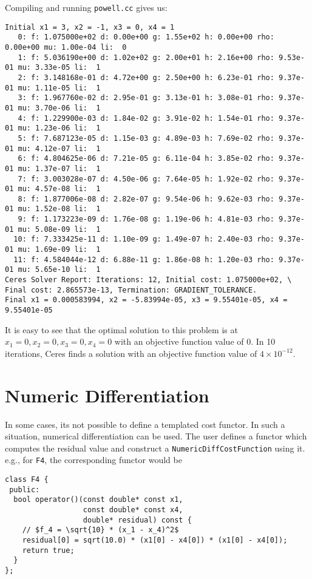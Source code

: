 Compiling and running \texttt{powell.cc} gives us:
\begin{verbatim}
Initial x1 = 3, x2 = -1, x3 = 0, x4 = 1
   0: f: 1.075000e+02 d: 0.00e+00 g: 1.55e+02 h: 0.00e+00 rho: 0.00e+00 mu: 1.00e-04 li:  0
   1: f: 5.036190e+00 d: 1.02e+02 g: 2.00e+01 h: 2.16e+00 rho: 9.53e-01 mu: 3.33e-05 li:  1
   2: f: 3.148168e-01 d: 4.72e+00 g: 2.50e+00 h: 6.23e-01 rho: 9.37e-01 mu: 1.11e-05 li:  1
   3: f: 1.967760e-02 d: 2.95e-01 g: 3.13e-01 h: 3.08e-01 rho: 9.37e-01 mu: 3.70e-06 li:  1
   4: f: 1.229900e-03 d: 1.84e-02 g: 3.91e-02 h: 1.54e-01 rho: 9.37e-01 mu: 1.23e-06 li:  1
   5: f: 7.687123e-05 d: 1.15e-03 g: 4.89e-03 h: 7.69e-02 rho: 9.37e-01 mu: 4.12e-07 li:  1
   6: f: 4.804625e-06 d: 7.21e-05 g: 6.11e-04 h: 3.85e-02 rho: 9.37e-01 mu: 1.37e-07 li:  1
   7: f: 3.003028e-07 d: 4.50e-06 g: 7.64e-05 h: 1.92e-02 rho: 9.37e-01 mu: 4.57e-08 li:  1
   8: f: 1.877006e-08 d: 2.82e-07 g: 9.54e-06 h: 9.62e-03 rho: 9.37e-01 mu: 1.52e-08 li:  1
   9: f: 1.173223e-09 d: 1.76e-08 g: 1.19e-06 h: 4.81e-03 rho: 9.37e-01 mu: 5.08e-09 li:  1
  10: f: 7.333425e-11 d: 1.10e-09 g: 1.49e-07 h: 2.40e-03 rho: 9.37e-01 mu: 1.69e-09 li:  1
  11: f: 4.584044e-12 d: 6.88e-11 g: 1.86e-08 h: 1.20e-03 rho: 9.37e-01 mu: 5.65e-10 li:  1
Ceres Solver Report: Iterations: 12, Initial cost: 1.075000e+02, \
Final cost: 2.865573e-13, Termination: GRADIENT_TOLERANCE.
Final x1 = 0.000583994, x2 = -5.83994e-05, x3 = 9.55401e-05, x4 = 9.55401e-05
\end{verbatim}
It is easy to see that the  optimal solution to this problem is at $x_1=0, x_2=0, x_3=0, x_4=0$ with an objective function value of $0$. In 10 iterations, Ceres finds a solution with an objective function value of $4\times 10^{-12}$.

\section{Numeric Differentiation}
In some cases, its not possible to define a templated cost functor. In such a situation, numerical differentiation can be used. The user defines a functor which computes the residual value and construct a \texttt{NumericDiffCostFunction} using it. e.g., for \texttt{F4}, the corresponding functor would be
\begin{verbatim}
class F4 {
 public:
  bool operator()(const double* const x1,
                  const double* const x4,
                  double* residual) const {
    // $f_4 = \sqrt{10} * (x_1 - x_4)^2$
    residual[0] = sqrt(10.0) * (x1[0] - x4[0]) * (x1[0] - x4[0]);
    return true;
  }
};
\end{verbatim}

